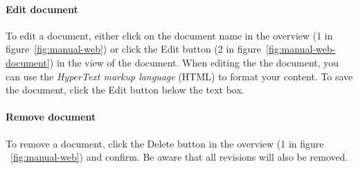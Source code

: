 	\paragraph{Edit document}
	To edit a document, either click on the document name in the overview (1 in figure~\ref{fig:manual-web}) or click the Edit button (2 in figure~\ref{fig:manual-web-document}) in the view of the document. When editing the the document, you can use the \emph{HyperText markup language}\cite{w3cHTML} (HTML) to format your content. To save the document, click the Edit button below the text box.
	
	\paragraph{Remove document}
	To remove a document, click the Delete button in the overview (1 in figure ~\ref{fig:manual-web}) and confirm. Be aware that all revisions will also be removed.
